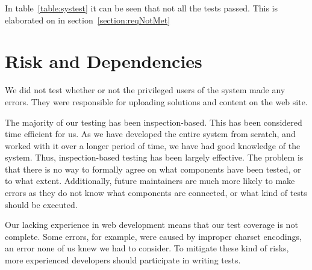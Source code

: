 In table~\ref{table:systest} it can be seen that not all the tests passed. This
is elaborated on in section~\ref{section:reqNotMet}

\section{Risk and Dependencies}
We did not test whether or not the privileged users of the system made any
errors. They were responsible for uploading solutions and content on the web
site.

The majority of our testing has been inspection-based. This has been considered
time efficient for us. As we have developed the entire system from scratch, and
worked with it over a longer period of time, we have had good knowledge of the
system. Thus, inspection-based testing has been largely effective. The problem
is that there is no way to formally agree on what components have been tested,
or to what extent. Additionally, future maintainers are much more likely to
make errors as they do not know what components are connected, or what kind of
tests should be executed.

Our lacking experience in web development means that our test coverage is not
complete. Some errors, for example, were caused by improper charset encodings,
an error none of us knew we had to consider. To mitigate these kind of risks,
more experienced developers should participate in writing tests.
